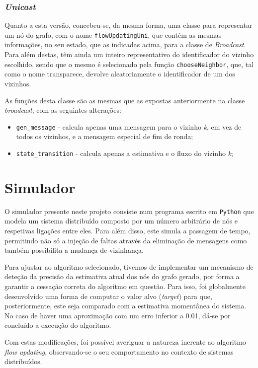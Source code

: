 \documentclass[a4paper]{article}
\begin{document}
{		\subsubsection{\textit{Unicast}}
		Quanto a esta versão, concebeu-se, da mesma forma, uma classe para representar um nó do grafo, com o nome \texttt{flowUpdatingUni}, que contém as mesmas informações, no seu estado, que as indicadas acima, para a classe de \textit{Broadcast}.
		Para além destas, têm ainda um inteiro representativo do identificador do vizinho escolhido, sendo que o mesmo é selecionado pela função \texttt{chooseNeighbor}, que, tal como o nome transparece, devolve aleatoriamente o identificador de um dos vizinhos.

		As funções desta classe são as mesmas que as expostas anteriormente na classe \textit{broadcast}, com as seguintes alterações:
		\begin{itemize}
			\item \texttt{gen\_message} - calcula apenas uma mensagem para o vizinho \textit{k}, em vez de todos os vizinhos, e a mensagem especial de fim de ronda;
			\item \texttt{state\_transition} - calcula apenas a estimativa e o fluxo do vizinho \textit{k};
		\end{itemize}
}

\section{Simulador} \label{sec:Simulator}
\large{
	O simulador presente neste projeto consiste num programa escrito em \texttt{Python} que modela um sistema distribuído composto por um número arbitrário de nós e respetivas ligações entre eles.
	Para além disso, este simula a passagem de tempo, permitindo não só a injeção de faltas através da eliminação de mensagens como também possibilita a mudança de vizinhança.

	Para ajustar ao algoritmo selecionado, tivemos de implementar um mecanismo de deteção da precisão da estimativa atual dos nós do grafo gerado, por forma a garantir a cessação correta do algoritmo em questão.
	Para isso, foi globalmente desenvolvido uma forma de computar o valor alvo (\textit{target}) para que, posteriormente, este seja comparado com a estimativa momentânea do sistema. No caso de haver uma aproximação com um erro inferior a 0.01, dá-se por concluído a execução do algoritmo.

	Com estas modificações, foi possível averiguar a natureza inerente ao algoritmo \textit{flow updating}, observando-se o seu comportamento no contexto de sistemas distribuídos.
}
\end{document}
